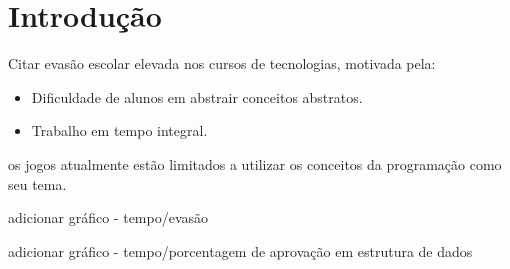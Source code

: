 \chapter{Introdução}

Citar evasão escolar elevada nos cursos de tecnologias, motivada pela:

\begin{itemize}
	\item Dificuldade de alunos em abstrair conceitos abstratos.
	\item Trabalho em tempo integral.
\end{itemize}

os jogos atualmente estão limitados a utilizar os conceitos da programação como seu tema. \cite{de2025codebo}

adicionar gráfico - tempo/evasão

adicionar gráfico - tempo/porcentagem de aprovação em estrutura de dados


